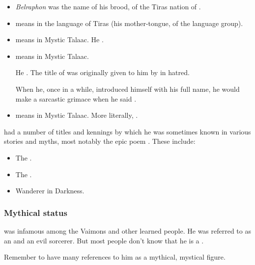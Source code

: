 \begin{itemize}
  \item
    \emph{Belraphon} was the name of his brood, of the Tiras nation of \Saphyr.
  \item
    \emph{\Quessanth} means  in the language of Tiras (his mother-tongue, of the \Saphyr language group).
  \item 
    \emph{\Nierzshah} means  in Mystic Talaac.
    He . 
  \item 
    \emph{\Tzeorossh} means  in Mystic Talaac.
    
    He . 
    The title of  was originally given to him by \Secherdamon in hatred.
    
    When he, once in a while, introduced himself with his full name, he would make a sarcastic grimace when he said \quo{\Tzeorossh}.
  \item 
    \quo{\Iscrafel} means  in Mystic Talaac. More literally, .
\end{itemize}

\Ishnaruchaefir{} had a number of titles and kennings by which he was sometimes known in various stories and myths, most notably the epic poem \emph{}. 
These include:

\begin{itemize}
  \item The .
  \item The .
  \item Wanderer in Darkness. 
\end{itemize}






\subsubsection{Mythical status}
\Ishnaruchaefir{} was infamous among the Vaimons and other learned people. 
He was referred to as an  and an evil \chaos{} sorcerer. 
But most people don't know that he is a \dragon. 

Remember to have many references to him as a mythical, mystical figure. 

